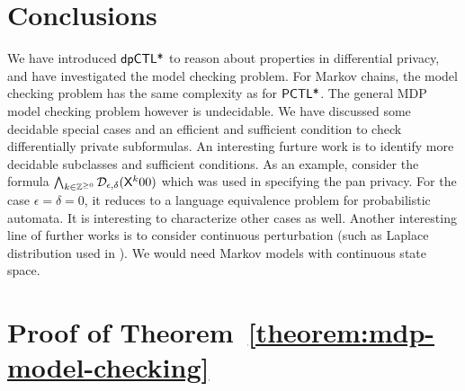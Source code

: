 \documentclass{llncs}
\begin{document}
%

\section{Conclusions}
\label{section:conclusions}
We have introduced $\textsf{dpCTL*}$ to reason about properties in differential privacy, and have investigated the model checking problem. For Markov chains, the model checking problem has the same complexity as for $\textsf{PCTL*}$. The general MDP model checking problem however is undecidable. 
We have discussed some decidable special cases and an efficient and sufficient condition to check differentially private subformulas.
An interesting furture work is to identify more
decidable subclasses and sufficient conditions.
As an example, consider the formula $\bigwedge_{k \in \mathbb{Z}^{\geq 0}}
\mathcal{D}_{{\epsilon}, {\delta}} (\mathsf{X}^k  00)$ which was used in specifying the pan privacy. For the case $\epsilon=\delta=0$, it reduces to a language equivalence problem for probabilistic automata. It is interesting to characterize other cases as well.
Another interesting line of further works is to consider continuous perturbation (such as Laplace distribution used in \cite{DR:14:AFDP}). We would need Markov models with continuous state space.





\newpage
\appendix

\section{Proof of Theorem~\ref{theorem:mdp-model-checking}}

\end{document}
